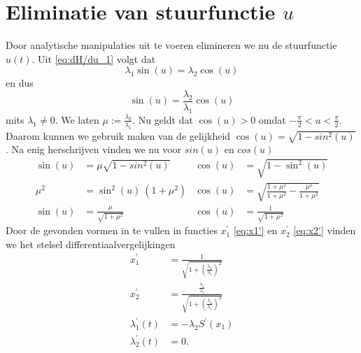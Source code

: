 \section{Eliminatie van stuurfunctie \(u\)}\label{sec:Eliminatie van u}
Door analytische manipulaties uit te voeren elimineren we nu de stuurfunctie \(u(t)\). Uit \eqref{eq:dH/du_1} volgt dat
\begin{equation*}
	\lambda_1 \sin(u) = \lambda_2 \cos(u)
\end{equation*}
en dus
\begin{equation*}
	\sin(u) = \frac{\lambda_2 }{\lambda_1}\cos(u)
\end{equation*}
mits \(\lambda_1\neq0\). We laten \(\mu := \frac{\lambda_2 }{\lambda_1}\)\label{mu}. Nu geldt dat \(\cos(u)>0\) omdat \(-\frac{\pi}{2} < u < \frac{\pi}{2}\). Daarom kunnen we gebruik maken van de gelijkheid \(\cos(u) =\sqrt{1-sin^2(u)}\). Na enig herschrijven vinden we nu voor \(sin(u)\) en \(cos(u)\)
\begin{align*}
	\sin(u) &= \mu\sqrt{1-sin^2(u)} & \cos(u) &= \sqrt{1-\sin^2(u)}\\
	\mu^2 &= \sin^2(u)~(1+\mu^2) & \cos(u) &= \sqrt{\frac{1+\mu^2}{1+\mu^2}-\frac{\mu^2}{1+\mu^2}}\\
	\sin(u) &= \frac{\mu}{\sqrt{1+\mu^2}} & \cos(u) &= \frac{1}{\sqrt{1+\mu^2}}
\end{align*}
Door de gevonden vormen in te vullen in functies \(x_1^\prime\) \eqref{eq:x1'} en \(x_2^\prime\) \eqref{eq:x2'} vinden we het stelsel differentiaalvergelijkingen
\begin{align*}
	x_1^\prime &= \frac{1}{\sqrt{1+(\frac{\lambda_2}{\lambda_1})^2}}\\
	x_2^\prime &= \frac{\frac{\lambda_2}{\lambda_1}}{\sqrt{1+(\frac{\lambda_2}{\lambda_1})^2}}\\
	\lambda_1^\prime(t) &= -\lambda_2S^\prime(x_1)\\
	\lambda_2^\prime(t) &= 0.
\end{align*}

